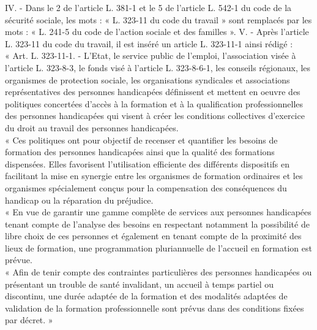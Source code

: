 IV. - Dans le 2 de l'article L. 381-1 et le 5 de l'article L. 542-1 du code de la sécurité sociale, les mots : « L. 323-11 du code du travail » sont remplacés par les mots : « L. 241-5 du code de l'action sociale et des familles ».
V. - Après l'article L. 323-11 du code du travail, il est inséré un article L. 323-11-1 ainsi rédigé :\\
« Art. L. 323-11-1. - L'Etat, le service public de l'emploi, l'association visée à l'article L. 323-8-3, le fonds visé à l'article L. 323-8-6-1, les conseils régionaux, les organismes de protection sociale, les organisations syndicales et associations représentatives des personnes handicapées définissent et mettent en oeuvre des politiques concertées d'accès à la formation et à la qualification professionnelles des personnes handicapées qui visent à créer les conditions collectives d'exercice du droit au travail des personnes handicapées.\\
« Ces politiques ont pour objectif de recenser et quantifier les besoins de formation des personnes handicapées ainsi que la qualité des formations dispensées. Elles favorisent l'utilisation efficiente des différents dispositifs en facilitant la mise en synergie entre les organismes de formation ordinaires et les organismes spécialement conçus pour la compensation des conséquences du handicap ou la réparation du préjudice.\\
« En vue de garantir une gamme complète de services aux personnes handicapées tenant compte de l'analyse des besoins en respectant notamment la possibilité de libre choix de ces personnes et également en tenant compte de la proximité des lieux de formation, une programmation pluriannuelle de l'accueil en formation est prévue.\\
« Afin de tenir compte des contraintes particulières des personnes handicapées ou présentant un trouble de santé invalidant, un accueil à temps partiel ou discontinu, une durée adaptée de la formation et des modalités adaptées de validation de la formation professionnelle sont prévus dans des conditions fixées par décret. »
